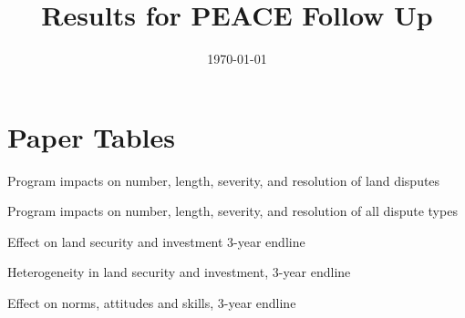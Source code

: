 \documentclass[10pt]{article}
\title{Results for PEACE Follow Up}
\date{\today}
\begin{document}
\maketitle 
\tableofcontents
\listoftables
\newpage
\clearpage


\section{Paper Tables}
\begin{table}[H]
\caption{ Program impacts on number, length, severity, and resolution of land disputes}
\label{land_conflict_paper_year}
\begin{center}
\begin{adjustbox}{max width = \textwidth}

\end{adjustbox}
\end{center}
\end{table}

\begin{table}[H]
\caption{Program impacts on number, length, severity, and resolution of all dispute types}
\begin{center}
\begin{adjustbox}{max width = \textwidth}
\label{all_conflict_paper_year}

\end{adjustbox}
\end{center}
\end{table}

\begin{table}[H]
\caption{Effect on land security and investment 3-year endline}
\begin{center}
\begin{adjustbox}{max width = \textwidth}

\end{adjustbox}
\end{center}
\end{table}

\begin{table}[H]
\caption{Heterogeneity in land security and investment, 3-year endline}
\begin{center}
\begin{adjustbox}{max width = \textwidth}

\end{adjustbox}
\end{center}
\end{table}

\begin{table}[H]
\caption{Effect on norms, attitudes and skills, 3-year endline}
\begin{center}
\begin{adjustbox}{max width = \textwidth}

\end{adjustbox}
\end{center}
\end{table}
\end{document}
